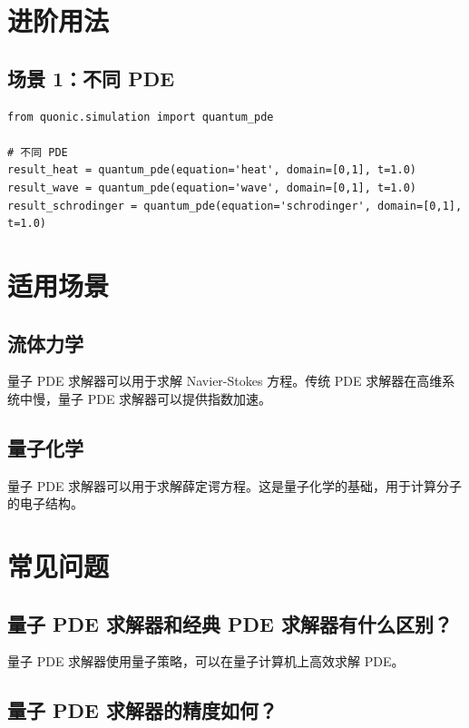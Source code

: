 \documentclass[12pt,a4paper]{article}
\begin{document}
\section{进阶用法}

\subsection{场景 1：不同 PDE}

\begin{verbatim}
from quonic.simulation import quantum_pde

# 不同 PDE
result_heat = quantum_pde(equation='heat', domain=[0,1], t=1.0)
result_wave = quantum_pde(equation='wave', domain=[0,1], t=1.0)
result_schrodinger = quantum_pde(equation='schrodinger', domain=[0,1], t=1.0)
\end{verbatim}

\section{适用场景}

\subsection{流体力学}

量子 PDE 求解器可以用于求解 Navier-Stokes 方程。传统 PDE 求解器在高维系统中慢，量子 PDE 求解器可以提供指数加速。

\subsection{量子化学}

量子 PDE 求解器可以用于求解薛定谔方程。这是量子化学的基础，用于计算分子的电子结构。

\section{常见问题}

\subsection{量子 PDE 求解器和经典 PDE 求解器有什么区别？}

量子 PDE 求解器使用量子策略，可以在量子计算机上高效求解 PDE。

\subsection{量子 PDE 求解器的精度如何？}
\end{document}
